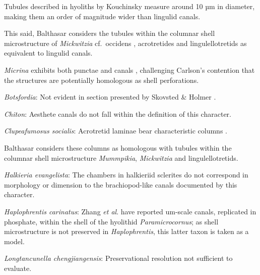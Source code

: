 \documentclass[openany]{book}
\theoremstyle{definition}
\theoremstyle{definition}
\theoremstyle{definition}
\theoremstyle{remark}
\begin{document}
Tubules described in hyoliths by Kouchinsky
\citeyearpar{Kouchinsky2000Skeletalmicrostructures} measure around 10 µm
in diameter, making them an order of magnitude wider than lingulid
canals.

This said, Balthasar \citeyearpar{Balthasar2008iMummpikia} considers the
tubules within the columnar shell microstructure of \emph{Mickwitzia}
cf.~occidens \citep[1--3 µm wide,][]{Skovsted2003EarlyCambrian},
acrotretides \citep[1 µm wide,
see][\citet{Zhang2016Epithelialcell}]{Holmer1989MiddleOrdovician} and
lingulellotretids \citep[100 nm wide,][]{Cusack1999Chemicostructural} as
equivalent to lingulid canals.

\emph{Micrina} exhibits both punctae and canals
\citep{Harper2017Brachiopodsorigin}, challenging Carlson's contention
\citep[in][]{Williams2007Supplement} that the structures are potentially
homologous as shell perforations.

\hypertarget{Botsfordia-coding-64}{}
\emph{Botsfordia}: Not evident in section presented by Skovsted \&
Holmer \citeyearpar{Skovsted2003EarlyCambrian}.

\hypertarget{Chiton-coding-64}{}
\emph{Chiton}: Aesthete canals do not fall within the definition of this
character.

\hypertarget{Clupeafumosus_socialis-coding-64}{}
\emph{Clupeafumosus socialis}: Acrotretid laminae bear characteristic
columns \citep[e.g.][]{Zhang2016Epithelialcell}.

Balthasar \citeyearpar{Balthasar2008iMummpikia} considers these columns
as homologous with tubules within the columnar shell microstructure
\emph{Mummpikia}, \emph{Mickwitzia} and lingulellotretids.

\hypertarget{Halkieria_evangelista-coding-64}{}
\emph{Halkieria evangelista}: The chambers in halkieriid sclerites do
not correspond in morphology or dimension to the brachiopod-like canals
documented by this character.

\hypertarget{Haplophrentis_carinatus-coding-64}{}
\emph{Haplophrentis carinatus}: Zhang \emph{et al}.
\citeyearpar{Zhang2018Ahyolithid} have reported um-scale canals,
replicated in phosphate, within the shell of the hyolithid
\emph{Paramicrocornus}; as shell microstructure is not preserved in
\emph{Haplophrentis}, this latter taxon is taken as a model.

\hypertarget{Longtancunella_chengjiangensis-coding-64}{}
\emph{Longtancunella chengjiangensis}: Preservational resolution not
sufficient to evaluate.
\end{document}
